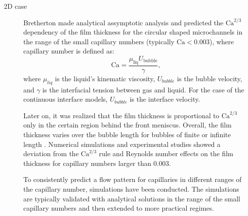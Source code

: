 \documentclass{CFD2011}
\newcommand{\Ca}{\mathrm{Ca}}
\begin{document}
\begin{description}
\item[2D case]
Bretherton made analytical assymptotic analysis and predicted the $\Ca^{2/3}$ dependency of the film
thickness for the circular shaped microchannels in the range of the small capillary numbers
(typically $\Ca<0.003$), where capillary number is defined as:
\begin{equation}
\label{capillary:number:definition}
\Ca=\frac{\mu_{\mathrm{liq}} U_\mathrm{bubble}}{\gamma},
\end{equation}
where $\mu_{liq}$ is the liquid's kinematic viscosity, $U_{bubble}$ is the bubble velocity, and
$\gamma$ is the interfacial tension between gas and liquid. For the case of the continuous
interface models,  $U_{bubble}$ is the interface velocity.

Later on, it was realized
\cite{wong-films,wong-pressure} that the film thickness
is proportional to $\Ca^{2/3}$ only in the certain region behind the front meniscus. Overall, the
film thickness
varies over the bubble length for bubbles of finite or infinite length
\cite{heil-threedim}. Numerical
simulations \cite{giavedoni-numerical} and experimental studies
\cite{kreutzer-pressure-drop} showed a deviation from the $\Ca^{2/3}$ rule and Reynolds number 
effects on the film thickness for capillary numbers larger than $0.003$.

To consistently  predict a flow pattern for capillaries in
different ranges of the capillary number, simulations have been conducted. The simulations are
typically validated with analytical solutions in the range of the small capillary numbers
 and then extended to more practical regimes.


\end{description}
\end{document}
